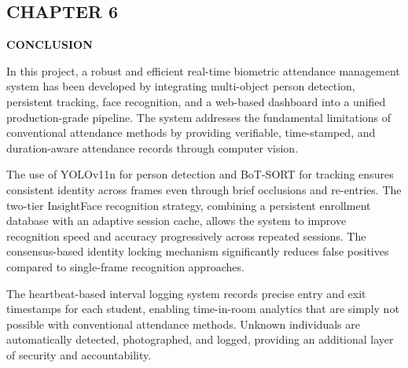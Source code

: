\documentclass{report}
\begin{document}
\newpage
\begin{center}
    \section*{\textbf{CHAPTER 6}}
\end{center}
\begin{center}
    \textbf{\Large CONCLUSION}\\[20pt]
\end{center}

\normalsize{
In this project, a robust and efficient real-time biometric attendance management system has been\vspace{3pt} developed by integrating multi-object person detection, persistent tracking, face recognition, and a\vspace{3pt} web-based dashboard into a unified production-grade pipeline. The system addresses the fundamental\vspace{3pt} limitations of conventional attendance methods by providing verifiable, time-stamped, and duration-\vspace{3pt}aware attendance records through computer vision.

The use of YOLOv11n for person detection and BoT-SORT for tracking ensures consistent identity\vspace{3pt} across frames even through brief occlusions and re-entries. The two-tier InsightFace recognition\vspace{3pt} strategy, combining a persistent enrollment database with an adaptive session cache, allows the\vspace{3pt} system to improve recognition speed and accuracy progressively across repeated sessions. The\vspace{3pt} consensus-based identity locking mechanism significantly reduces false positives compared to\vspace{3pt} single-frame recognition approaches.

The heartbeat-based interval logging system records precise entry and exit timestamps for each\vspace{3pt} student, enabling time-in-room analytics that are simply not possible with conventional attendance\vspace{3pt} methods. Unknown individuals are automatically detected, photographed, and logged, providing\vspace{3pt} an additional layer of security and accountability.

}
\end{document}
